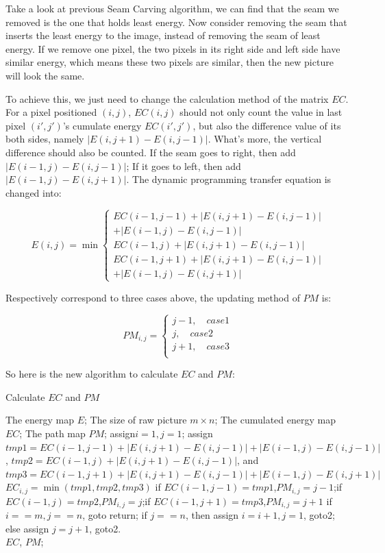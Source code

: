 \documentclass[final]{cvpr}
\begin{document}
Take a look at previous Seam Carving algorithm, we can find that the seam we removed is the one that holds least energy. Now consider removing the seam that inserts the least energy to the image, instead of removing the seam of least energy. If we remove one pixel, the two pixels in its right side and left side have similar energy, which means these two pixels are similar, then the new picture will look the same.

To achieve this, we just need to change the calculation method of the matrix $EC$. For a pixel positioned $(i,j)$, $EC(i,j)$ should not only count the value in last pixel $(i',j')$'s cumulate energy $EC(i',j')$, but also the difference value of its both sides, namely $|E(i,j+1)-E(i,j-1)|$. What's more, the vertical difference should also be counted. If the seam goes to right, then add $|E(i-1,j)-E(i,j-1)|$; If it goes to left, then add $|E(i-1,j)-E(i,j+1)|$. The dynamic programming transfer equation is changed into:

$$
E(i,j)=\min
\left\{
\begin{matrix}{}
EC(i-1,j-1)+|E(i,j+1)-E(i,j-1)|\\
+|E(i-1,j)-E(i,j-1)|\\
EC(i-1,j)+|E(i,j+1)-E(i,j-1)|\\
EC(i-1,j+1)+|E(i,j+1)-E(i,j-1)|\\
+|E(i-1,j)-E(i,j+1)|
\end{matrix}
\right.
$$

Respectively correspond to three cases above, the updating method of $PM$ is:

$$
PM_{i,j}=
\left\{\begin{matrix}{}
j-1,\quad case1\\
j,\quad case2\\
j+1,\quad case3\\
\end{matrix}\right.
$$

So here is the new algorithm to calculate $EC$ and $PM$:

\begin{algorithm}[htb]  
  \caption{Calculate $EC$ and $PM$}  
  \begin{algorithmic}[1]  
    \Require
    The energy map $E$;
    The size of raw picture $m\times n$;
    \Ensure  
    The cumulated energy map $EC$; 
    The path map $PM$;
    \State assign$i=1,j=1$;  
    \State assign $tmp1 = EC(i-1,j-1)+|E(i,j+1)-E(i,j-1)|+|E(i-1,j)-E(i,j-1)|$, $tmp2 = EC(i-1,j)+|E(i,j+1)-E(i,j-1)|$, and $tmp3 = EC(i-1,j+1)+|E(i,j+1)-E(i,j-1)|+|E(i-1,j)-E(i,j+1)|$
    \State $EC_{i,j}=\min(tmp1, tmp2, tmp3)$ 
    \State if $EC(i-1,j-1)=tmp1$,$PM_{i,j}=j-1$;if $EC(i-1,j)=tmp2$,$PM_{i,j}=j$;if $EC(i-1,j+1)=tmp3$,$PM_{i,j}=j+1$ 
    \State if $i==m,j==n$, goto return; if $j==n$, then assign $i=i+1,j=1$, goto2; else assign $j=j+1$, goto2.\\
    \Return $EC$, $PM$;
  \end{algorithmic}  
\end{algorithm}
\end{document}
